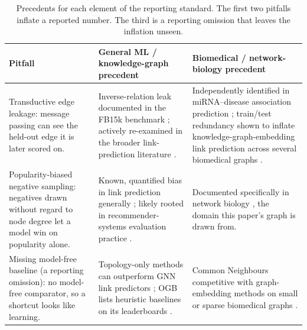 \begin{table}[h!]
\caption{Precedents for each element of the reporting standard. The first two pitfalls inflate a
reported number. The third is a reporting omission that leaves the inflation unseen.}
\label{tab:known_pitfalls}
\small
\begin{tabular}{>{\raggedright\arraybackslash}p{2.9cm}>{\raggedright\arraybackslash}p{4.0cm}>{\raggedright\arraybackslash}p{4.0cm}}
\hline
Pitfall & General ML / knowledge-graph precedent & Biomedical / network-biology precedent \\
\hline
Transductive edge leakage: message passing can see the held-out edge it is later
scored on. & Inverse-relation leak documented in the FB15k benchmark
\cite{toutanova2015observed}; actively re-examined in the broader link-prediction
literature \cite{zhu2023pitfalls,li2023evaluating}. & Independently identified in
miRNA--disease association prediction \cite{dong2020mirnaleakage}; train/test
redundancy shown to inflate knowledge-graph-embedding link prediction across several
biomedical graphs \cite{briere2026kgeleakage}. \\
Popularity-biased negative sampling: negatives drawn without regard to node degree
let a model win on popularity alone. & Known, quantified bias in link prediction
generally \cite{kotnis2017analysis,aiyappa2024implicit}; likely rooted in
recommender-systems evaluation practice \cite{krichene2020sampled}. & Documented
specifically in network biology \cite{yilmaz2025biasaware}, the domain this paper's
graph is drawn from. \\
Missing model-free baseline (a reporting omission): no model-free comparator, so a shortcut looks like learning. &
Topology-only methods can outperform GNN link predictors \cite{huang2023gelato}; OGB
lists heuristic baselines on its leaderboards \cite{ogb2026leaderboard}. & Common Neighbours
competitive with graph-embedding methods on small or sparse biomedical graphs
\cite{crichton2018realistic}. \\
\hline
\end{tabular}
\end{table}
